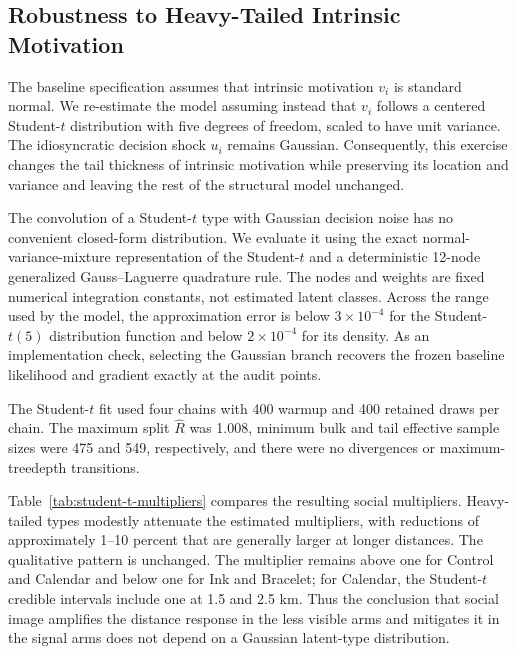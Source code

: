 \documentclass[12pt]{article}
\begin{document}
\providecommand{\StructuralRobustnessPath}{appendix/structural-robustness}

\subsection{Robustness to Heavy-Tailed Intrinsic Motivation}
\label{app:student-t-types}

The baseline specification assumes that intrinsic motivation $v_i$ is
standard normal. We re-estimate the model assuming instead that $v_i$ follows
a centered Student-$t$ distribution with five degrees of freedom, scaled to
have unit variance. The idiosyncratic decision shock $u_i$ remains Gaussian.
Consequently, this exercise changes the tail thickness of intrinsic
motivation while preserving its location and variance and leaving the rest of
the structural model unchanged.

The convolution of a Student-$t$ type with Gaussian decision noise has no
convenient closed-form distribution. We evaluate it using the exact
normal-variance-mixture representation of the Student-$t$ and a deterministic
12-node generalized Gauss--Laguerre quadrature rule. The nodes and weights are
fixed numerical integration constants, not estimated latent classes. Across
the range used by the model, the approximation error is below $3\times10^{-4}$
for the Student-$t(5)$ distribution function and below $2\times10^{-4}$ for
its density. As an implementation check, selecting the Gaussian branch
recovers the frozen baseline likelihood and gradient exactly at the audit
points.

The Student-$t$ fit used four chains with 400 warmup and 400 retained draws per
chain. The maximum split $\widehat R$ was 1.008, minimum bulk and tail effective
sample sizes were 475 and 549, respectively, and there were no divergences or
maximum-treedepth transitions.

Table~\ref{tab:student-t-multipliers} compares the resulting social
multipliers. Heavy-tailed types modestly attenuate the estimated multipliers,
with reductions of approximately 1--10 percent that are generally larger at
longer distances. The qualitative pattern is unchanged. The multiplier
remains above one for Control and Calendar and below one for Ink and Bracelet;
for Calendar, the Student-$t$ credible intervals include one at 1.5 and 2.5
km. Thus the conclusion that social image amplifies the distance response in
the less visible arms and mitigates it in the signal arms does not depend on a
Gaussian latent-type distribution.
\end{document}
